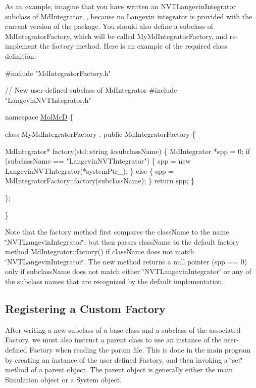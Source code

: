 As an example, imagine that you have written an N\+V\+T\+Langevin\+Integrator subclass of Md\+Integrator, , because no Langevin integrator is provided with the current version of the package. You should also define a subclass of Md\+Integrator\+Factory, which will be called My\+Md\+Integrator\+Factory, and re-\/implement the factory method. Here is an example of the required class definition\+: 
\begin{DoxyCode}
\textcolor{preprocessor}{#include "MdIntegratorFactory.h"}

\textcolor{comment}{// New user-defined subclass of MdIntegrator }
\textcolor{preprocessor}{#include "LangevinNVTIntegrator.h"}

\textcolor{keyword}{namespace }\hyperlink{namespaceMolMcD}{MolMcD} 
\{

   \textcolor{keyword}{class }MyMdIntegratorFactory : \textcolor{keyword}{public} MdIntegratorFactory 
   \{

      MdIntegrator* factory(std::string &subclassName)
      \{
         MdIntegrator *spp = 0;
         \textcolor{keywordflow}{if} (subclassName == \textcolor{stringliteral}{"LangevinNVTIntegrator"}) \{
            spp = \textcolor{keyword}{new} LangevinNVTIntegrator(*systemPtr\_);
         \} \textcolor{keywordflow}{else} \{
            spp = MdIntegratorFactory::factory(subclassName);
         \}
         \textcolor{keywordflow}{return} spp;
      \}

   \};

\}
\end{DoxyCode}
 Note that the factory method first compares the class\+Name to the name \char`\"{}\+N\+V\+T\+Langevin\+Integrator\char`\"{}, but then passes class\+Name to the default factory method Md\+Integrator\+::factory() if class\+Name does not match \char`\"{}\+N\+V\+T\+Langevin\+Integrator\char`\"{}. The new method returns a null pointer (spp == 0) only if subclass\+Name does not match either \char`\"{}\+N\+V\+T\+Langevin\+Integrator\char`\"{} or any of the subclass names that are recognized by the default implementation.\hypertarget{extension_page_set_factory_extend_sec}{}\subsection{Registering a Custom Factory}\label{extension_page_set_factory_extend_sec}
After writing a new subclass of a base class and a subclass of the associated Factory, we must also instruct a parent class to use an instance of the user-\/defined Factory when reading the param file. This is done in the main program by creating an instance of the user defined Factory, and then invoking a \char`\"{}set\char`\"{} method of a parent object. The parent object is generally either the main Simulation object or a System object.

